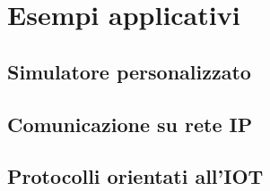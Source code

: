 \chapter{Esempi applicativi}
\section{Simulatore personalizzato}
\section{Comunicazione su rete IP}
\section{Protocolli orientati all'IOT}